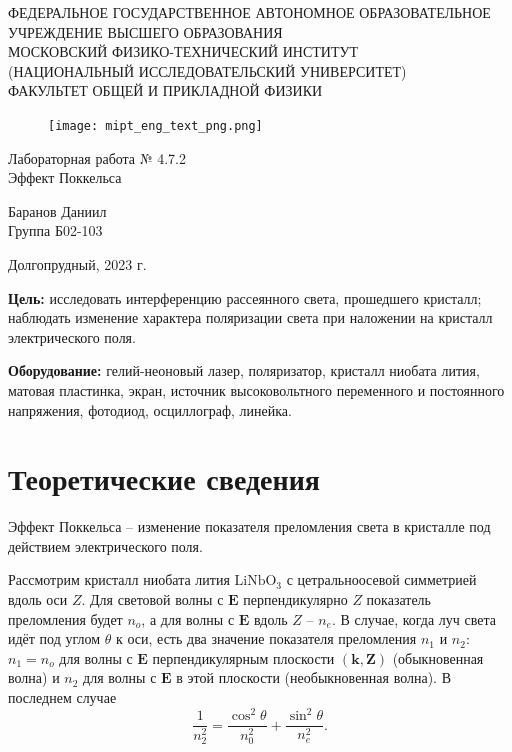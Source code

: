 \documentclass[a4paper,12pt]{article} %
\begin{document}
\begin{center}
	\footnotesize{ФЕДЕРАЛЬНОЕ ГОСУДАРСТВЕННОЕ АВТОНОМНОЕ ОБРАЗОВАТЕЛЬНОЕ 			УЧРЕЖДЕНИЕ ВЫСШЕГО ОБРАЗОВАНИЯ}\\
	\footnotesize{МОСКОВСКИЙ ФИЗИКО-ТЕХНИЧЕСКИЙ ИНСТИТУТ\\(НАЦИОНАЛЬНЫЙ 			ИССЛЕДОВАТЕЛЬСКИЙ УНИВЕРСИТЕТ)}\\
	\footnotesize{ФАКУЛЬТЕТ ОБЩЕЙ И ПРИКЛАДНОЙ ФИЗИКИ\\}
	\hfill \break
	\hfill \break
	\hfill \break
	\hfill \break
\end{center}


\begin{figure}[h]
    \centering
    \texttt{[image: mipt\_eng\_text\_png.png]}
    \label{fig:my_label}
\end{figure}


\begin{center}   
    \hfill \break
	\hfill \break
	\hfill \break
	\large{Лабораторная работа № 4.7.2\\ \hfill \break\Large{Эффект Поккельса}}\\
	\hfill \break
	\hfill \break
	\hfill \break
	\hfill \break
	\begin{flushright}
		Баранов Даниил\\
		Группа Б02-103
	\end{flushright}
	\hfill \break
	\hfill \break
	\hfill \break
\end{center}
\hfill \break
\hfill \break
\hfill \break
\hfill \break
\begin{center}
	Долгопрудный, 2023 г.
\end{center}
\thispagestyle{empty}

\newpage

\textbf{Цель:} исследовать интерференцию рассеянного света, прошедшего кристалл; наблюдать изменение характера поляризации света при наложении на кристалл электрического поля.

\textbf{Оборудование:} гелий-неоновый лазер, поляризатор, кристалл ниобата лития, матовая пластинка, экран, источник высоковольтного переменного и постоянного напряжения, фотодиод, осциллограф, линейка.

\section{Теоретические сведения}
Эффект Поккельса -- изменение показателя преломления света в кристалле под действием электрического поля.

Рассмотрим кристалл ниобата лития $\text{LiNbO}_3$ с цетральноосевой симметрией вдоль оси $Z$. Для световой волны с $\mathbf{E}$ перпендикулярно $Z$ показатель преломления будет $n_o$, а для волны с $\mathbf{E}$ вдоль $Z$ -- $n_e$. В случае, когда луч света идёт под углом $\theta$ к оси, есть два значение показателя преломления $n_1$ и $n_2$: $n_1 = n_o$ для волны с $\mathbf{E}$ перпендикулярным плоскости $(\mathbf{k},\mathbf{Z})$ (обыкновенная волна) и $n_2$ для волны с $\mathbf{E}$ в этой плоскости (необыкновенная волна). В последнем случае
\begin{equation}
\dfrac{1}{n_2^2}=\dfrac{\cos^2 \theta}{n_0^2}+\dfrac{\sin^2 \theta}{n_e^2}.
\end{equation}
\end{document}
